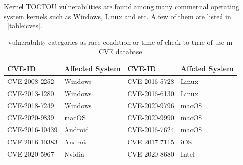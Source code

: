 
Kernel TOCTOU vulnerabilities are found among many commercial operating system kernels such as Windows, Linux and etc. A few of them are listed in
~\autoref{table:cves}.

\begin{center}
\begin{table}[ht]
\small
\caption{vulnerability categories as race condition or time-of-check-to-time-of-use in CVE database}
\label{table:cves}
\centering
	\begin{tabular}{@{}>{\raggedright\arraybackslash}m{2.30cm}@{}|
			@{}>{\centering\arraybackslash}m{1.30cm}@{}|
			@{}>{\centering\arraybackslash}m{2.30cm}@{}|
			@{}>{\centering\arraybackslash}m{1.20cm}@{} } 
\hline
CVE-ID & Affected System & CVE-ID & Affcted System \\ %
\hline
CVE-2008-2252  & Windows & CVE-2016-5728 & Linux \\
CVE-2013-1280  & Windows & CVE-2016-6130 & Linux \\
CVE-2018-7249  & Windows & CVE-2020-9796 & macOS \\ 
CVE-2020-9839  & macOS   & CVE-2020-9990 & macOS \\
CVE-2016-10439 & Android & CVE-2016-7624 & macOS \\
CVE-2016-10383 & Android & CVE-2017-7115 & iOS \\

CVE-2020-5967  & Nvidia  & CVE-2020-8680 & Intel \\
\hline

\end{tabular}
\end{table}
\end{center}

